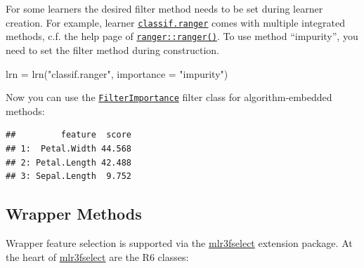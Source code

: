 \documentclass[
]{scrbook}
\newenvironment{Shaded}{\begin{snugshade}}{\end{snugshade}}
\newcommand{\AttributeTok}[1]{\textcolor[rgb]{0.77,0.63,0.00}{#1}}
\newcommand{\DecValTok}[1]{\textcolor[rgb]{0.00,0.00,0.81}{#1}}
\newcommand{\FunctionTok}[1]{\textcolor[rgb]{0.00,0.00,0.00}{#1}}
\newcommand{\NormalTok}[1]{#1}
\newcommand{\OtherTok}[1]{\textcolor[rgb]{0.56,0.35,0.01}{#1}}
\newcommand{\SpecialCharTok}[1]{\textcolor[rgb]{0.00,0.00,0.00}{#1}}
\newcommand{\StringTok}[1]{\textcolor[rgb]{0.31,0.60,0.02}{#1}}
\renewenvironment{Shaded} {\begin{snugshade}\small} {\end{snugshade}}
\begin{document}
For some learners the desired filter method needs to be set during learner creation.
For example, learner \href{https://mlr3learners.mlr-org.com/reference/mlr_learners_classif.ranger.html}{\texttt{classif.ranger}} comes with multiple integrated methods, c.f. the help page of \href{https://www.rdocumentation.org/packages/ranger/topics/ranger}{\texttt{ranger::ranger()}}.
To use method ``impurity'', you need to set the filter method during construction.

\begin{Shaded}
\begin{Highlighting}[]
\NormalTok{lrn }\OtherTok{=} \FunctionTok{lrn}\NormalTok{(}\StringTok{"classif.ranger"}\NormalTok{, }\AttributeTok{importance =} \StringTok{"impurity"}\NormalTok{)}
\end{Highlighting}
\end{Shaded}

Now you can use the \href{https://mlr3filters.mlr-org.com/reference/mlr_filters_importance.html}{\texttt{FilterImportance}} filter class for algorithm-embedded methods:

\begin{Shaded}
\end{Shaded}

\begin{verbatim}
##         feature  score
## 1:  Petal.Width 44.568
## 2: Petal.Length 42.488
## 3: Sepal.Length  9.752
\end{verbatim}

\hypertarget{fs-wrapper}{%
\subsection{Wrapper Methods}\label{fs-wrapper}}

Wrapper feature selection is supported via the \href{https://mlr3fselect.mlr-org.com}{mlr3fselect} extension package.
At the heart of \href{https://mlr3fselect.mlr-org.com}{mlr3fselect} are the R6 classes:
\end{document}
